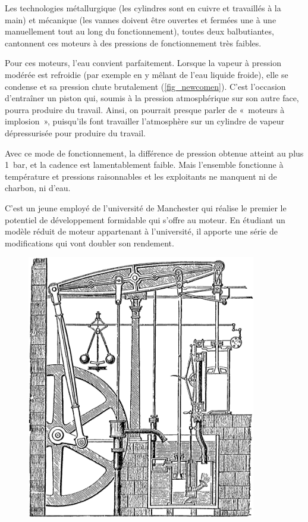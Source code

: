 	Les technologies métallurgique (les cylindres sont en cuivre et travaillés à la main) et mécanique (les vannes doivent être ouvertes et fermées une à une manuellement tout au long du fonctionnement), toutes deux balbutiantes, cantonnent ces moteurs à des pressions de fonctionnement très faibles.

	Pour ces moteurs, l’eau convient parfaitement. Lorsque la vapeur à pression modérée est refroidie (par exemple en y mêlant de l’eau liquide froide), elle se condense et sa pression chute brutalement (\cref{fig_newcomen}). C’est l’occasion d’entraîner un piston qui, soumis à la pression atmosphérique sur son autre face, pourra produire du travail. Ainsi, on pourrait presque parler de «~moteurs à implosion~», puisqu’ils font travailler l’atmosphère sur un cylindre de vapeur dépressurisée pour produire du travail.

	Avec ce mode de fonctionnement, la différence de pression obtenue atteint au plus \SI{1}{\bar}, et la cadence est lamentablement faible. Mais l’ensemble fonctionne à température et pressions raisonnables et les exploitants ne manquent ni de charbon, ni d’eau.

	C’est un jeune employé de l’université de Manchester qui réalise le premier le potentiel de développement formidable qui s’offre au moteur. En étudiant un modèle réduit de moteur appartenant à l’université, il apporte une série de modifications qui vont doubler son rendement.

	\begin{figure}
	\begin{center}
		\includegraphics[width=10cm]{images/steam_engine_boulton_watt.png}
	\end{center}
	\label{fig_boultonwattengine}
	\end{figure}

